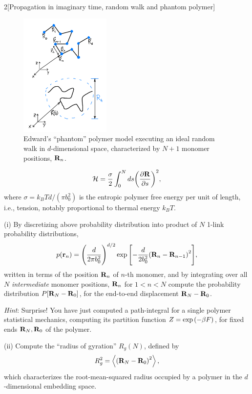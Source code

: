 \documentclass[12pt]{article}
\begin{document}
\begin{problem}{2}[Propagation in imaginary time, random walk and phantom
    polymer]
\begin{figure}
    \centering
    \includegraphics[width=0.4\textwidth]{p2b.png}
    \caption{Edward's ``phantom'' polymer model executing an ideal random walk
    in $d$-dimensional space, characterized by $N+1$ monomer positions,
$\vb{R}_n$.}
\label{fig:p2b}
\end{figure}

\begin{equation}
    \mathcal{H}=\frac\sigma2\int_0^Nds\qty(\frac{\partial\vb{R}}{\partial s})^2,  
\end{equation}
where $\sigma=k_BTd/(\pi b_0^2)$ is the entropic polymer free energy per unit of
length, i.e., tension, notably proportional to thermal energy $k_BT$.

\qquad(i) By discretizing above probability distribution into product of $N$
1-link probability distributions,
\begin{equation}
    p(\vb{r}_n)=\qty(\frac{d}{2\pi b_0^2})^{d/2}
    \exp\qty[-\frac{d}{2b_0^2}\qty(\vb{R}_n-\vb{R}_{n-1})^2],
\end{equation}
written in terms of the position $\vb{R}_n$ of $n$-th monomer, and by
integrating over all $N$ \textit{intermediate} monomer positions, $\vb{R}_n$ for
$1<n<N$ compute the probability distribution $P\qty[\vb{R}_N-\vb{R}_0]$, for the
end-to-end displacement $\vb{R}_N-\vb{R}_0$.

\textit{Hint}: Surprise! You have just computed a path-integral for a single
polymer statistical mechanics, computing its partition function
$Z=\exp\qty(-\beta F)$, for fixed ends $\vb{R}_N,\vb{R}_0$ of the polymer.
\begin{solution}
    
\end{solution}

\qquad(ii) Compute the ``radius of gyration'' $R_g(N)$, defined by
\begin{equation}
    R_g^2=\expval{\qty(\vb{R}_N-\vb{R}_0)^2}, 
\end{equation}
which characterizes the root-mean-squared radius occupied by a polymer in the
$d$-dimensional embedding space.


\end{problem}
\end{document}
